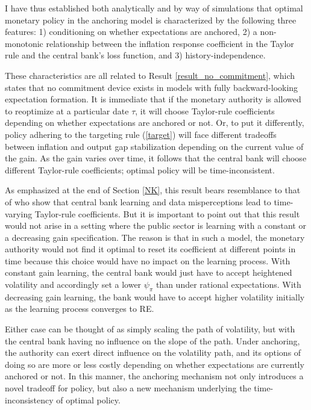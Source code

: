 \documentclass[11pt]{article}
\renewcommand{\[}{\begin{equation}}
\renewcommand{\]}{\end{equation}}
\begin{document}
I have thus established both analytically and by way of simulations that optimal monetary policy in the anchoring model is characterized by the following three features: 1) conditioning on whether expectations are anchored, 2) a non-monotonic relationship between the inflation response coefficient in the Taylor rule and the central bank's loss function, and 3) history-independence.

These characteristics are all related to Result \ref{result_no_commitment}, which states that no commitment device exists in models with fully backward-looking expectation formation. It is immediate that if the monetary authority is allowed to reoptimize at a particular date $\tau$, it will choose Taylor-rule coefficients depending on whether expectations are anchored or not. Or, to put it differently, policy adhering to the targeting rule (\ref{target}) will face different tradeoffs between inflation and output gap stabilization depending on the current value of the gain. As the gain varies over time, it follows that the central bank will choose different Taylor-rule coefficients; optimal policy will be time-inconsistent. 

As emphasized at the end of Section \ref{NK}, this result bears resemblance to that of \cite{LUBIK201685} who show that central bank learning and data misperceptions lead to time-varying Taylor-rule coefficients. But it is important to point out that this result would not arise in a setting where the public sector is learning with a constant or a decreasing gain specification. The reason is that in such a model, the monetary authority would not find it optimal to reset its coefficient at different points in time because this choice would have no impact on the learning process. With constant gain learning, the central bank would just have to accept heightened volatility and accordingly set a lower $\psi_{\pi}$ than under rational expectations. With decreasing gain learning, the bank would have to accept higher volatility initially as the learning process converges to RE. 

Either case can be thought of as simply scaling the path of volatility, but with the central bank having no influence on the slope of the path. Under anchoring, the authority can exert direct influence on the volatility path, and its options of doing so are more or less costly depending on whether expectations are currently anchored or not. In this manner, the anchoring mechanism not only introduces a novel tradeoff for policy, but also a new mechanism underlying the time-inconsistency of optimal policy. 
\end{document}

